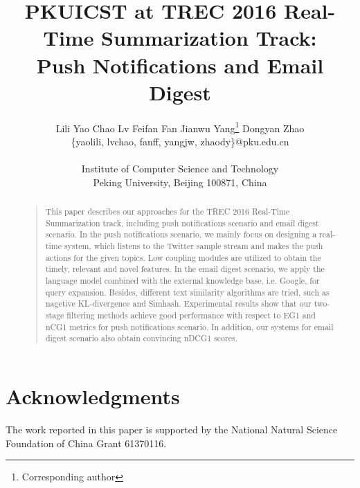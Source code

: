 \documentclass[letterpaper]{article}
\begin{document}
%
\title{PKUICST at TREC 2016 Real-Time Summarization Track:\\
Push Notifications and Email Digest
}
\author{Lili Yao \quad Chao Lv \quad Feifan Fan \quad Jianwu Yang\footnote{Corresponding author} \quad Dongyan Zhao\\
\{yaolili, lvchao, fanff, yangjw, zhaody\}@pku.edu.cn\\
\\
Institute of Computer Science and Technology\\
Peking University, Beijing 100871, China\\
}

\maketitle
\begin{abstract}
\begin{quote}
This paper describes our approaches for the TREC 2016 Real-Time Summarization track,
including push notifications scenario and email digest scenario.
In the push notifications scenario, we mainly focus on designing a real-time system,
which listens to the Twitter sample stream and makes the push actions for the given topics.
Low coupling modules are utilized to obtain the timely, relevant and novel features.
In the email digest scenario, we apply the language model combined
with the external knowledge base, i.e. Google, for query expansion.
Besides, different text similarity algorithms are tried, such as nagetive KL-divergence and Simhash.
Experimental results show that our two-stage filtering methods achieve good performance
with respect to EG1 and nCG1 metrics for push notifications scenario.
In addition, our systems for email digest scenario also obtain convincing nDCG1 scores.
\end{quote}
\end{abstract}








\section{Acknowledgments}
The work reported in this paper is supported by the National Natural Science Foundation of China Grant 61370116.



\end{document}
